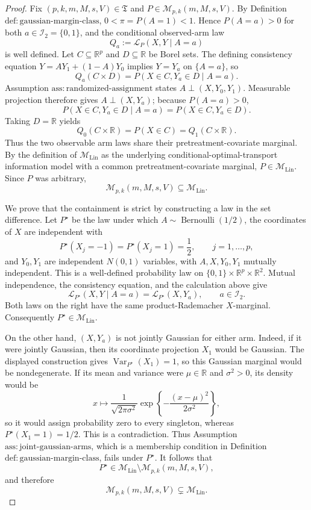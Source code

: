 \documentclass{article}
\begin{document}
\begin{proof}
Fix \((p,k,m,M,s,V)\in\mathfrak T\) and
\(P\in\mathcal M_{p,k}(m,M,s,V)\).  By Definition
\(\mathrm{def{:}gaussian\text{-}margin\text{-}class}\),
\(0<\pi=P(A=1)<1\).  Hence \(P(A=a)>0\) for both
\(a\in\mathcal I_2=\{0,1\}\), and the conditional observed-arm law
\[
Q_a:=\mathcal L_P(X,Y\mid A=a)
\]
is well defined.  Let \(C\subseteq\mathbb R^p\) and
\(D\subseteq\mathbb R\) be Borel sets.  The defining consistency equation
\(Y=AY_1+(1-A)Y_0\) implies \(Y=Y_a\) on \(\{A=a\}\), so
\[
Q_a(C\times D)
=P(X\in C,Y_a\in D\mid A=a).
\]
Assumption \(\mathrm{ass{:}randomized\text{-}assignment}\) states
\(A\perp(X,Y_0,Y_1)\).  Measurable projection therefore gives
\(A\perp(X,Y_a)\); because \(P(A=a)>0\),
\[
P(X\in C,Y_a\in D\mid A=a)
=P(X\in C,Y_a\in D).
\]
Taking \(D=\mathbb R\) yields
\[
Q_0(C\times\mathbb R)
=P(X\in C)
=Q_1(C\times\mathbb R).
\]
Thus the two observable arm laws share their pretreatment-covariate
marginal.  By the definition of \(\mathcal M_{\mathrm{Lin}}\) as the
underlying conditional-optimal-transport information model with a common
pretreatment-covariate marginal, \(P\in\mathcal M_{\mathrm{Lin}}\).
Since \(P\) was arbitrary,
\[
\mathcal M_{p,k}(m,M,s,V)\subseteq\mathcal M_{\mathrm{Lin}}.
\]

We prove that the containment is strict by constructing a law in the
set difference.  Let \(P^\star\) be the law under which
\(A\sim\operatorname{Bernoulli}(1/2)\), the coordinates of \(X\) are
independent with
\[
P^\star(X_j=-1)=P^\star(X_j=1)=\frac12,
\qquad j=1,\ldots,p,
\]
and \(Y_0,Y_1\) are independent \(N(0,1)\) variables, with
\(A,X,Y_0,Y_1\) mutually independent.  This is a well-defined probability
law on \(\{0,1\}\times\mathbb R^p\times\mathbb R^2\).  Mutual independence,
the consistency equation, and the calculation above give
\[
\mathcal L_{P^\star}(X,Y\mid A=a)
=\mathcal L_{P^\star}(X,Y_a),
\qquad a\in\mathcal I_2.
\]
Both laws on the right have the same product-Rademacher \(X\)-marginal.
Consequently \(P^\star\in\mathcal M_{\mathrm{Lin}}\).

On the other hand, \((X,Y_a)\) is not jointly Gaussian for either arm.
Indeed, if it were jointly Gaussian, then its coordinate projection
\(X_1\) would be Gaussian.  The displayed construction gives
\(\operatorname{Var}_{P^\star}(X_1)=1\), so this Gaussian marginal would
be nondegenerate.  If its mean and variance were \(\mu\in\mathbb R\) and
\(\sigma^2>0\), its density would be
\[
x\longmapsto
\frac{1}{\sqrt{2\pi\sigma^2}}
\exp\!\left\{-\frac{(x-\mu)^2}{2\sigma^2}\right\},
\]
so it would assign probability zero to every singleton, whereas
\(P^\star(X_1=1)=1/2\).  This is a contradiction.  Thus
Assumption \(\mathrm{ass{:}joint\text{-}gaussian\text{-}arms}\), which is
a membership condition in Definition
\(\mathrm{def{:}gaussian\text{-}margin\text{-}class}\), fails under
\(P^\star\).  It follows that
\[
P^\star\in
\mathcal M_{\mathrm{Lin}}\setminus
\mathcal M_{p,k}(m,M,s,V),
\]
and therefore
\[
\mathcal M_{p,k}(m,M,s,V)\subsetneq\mathcal M_{\mathrm{Lin}}.
\]


\end{proof}
\end{document}
